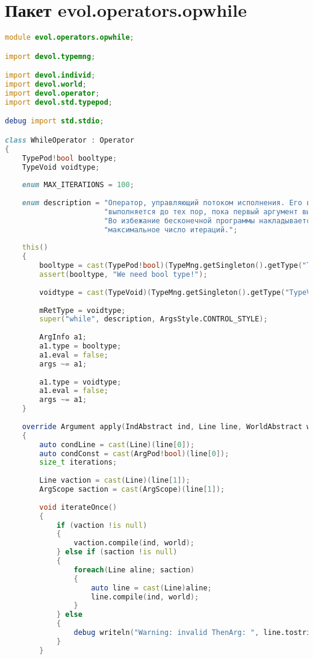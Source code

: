 \documentclass[russian,utf8,emptystyle]{eskdtext}
\begin{document}
\section{Пакет evol.operators.opwhile}
\begin{lstlisting}[language=D]
module evol.operators.opwhile;

import devol.typemng;

import devol.individ;
import devol.world;
import devol.operator;  
import devol.std.typepod;

debug import std.stdio;

class WhileOperator : Operator
{
    TypePod!bool booltype;
    TypeVoid voidtype;
    
    enum MAX_ITERATIONS = 100;
    
    enum description = "Оператор, управляющий потоком исполнения. Его второй аргумент "
                       "выполняется до тех пор, пока первый аргумент вычисляется в ИСТИНА. "
                       "Во избежание бесконечной программы накладывается ограничение на "
                       "максимальное число итераций.";
    
    this()
    {
        booltype = cast(TypePod!bool)(TypeMng.getSingleton().getType("Typebool"));
        assert(booltype, "We need bool type!");
        
        voidtype = cast(TypeVoid)(TypeMng.getSingleton().getType("TypeVoid"));
        
        mRetType = voidtype;
        super("while", description, ArgsStyle.CONTROL_STYLE);
        
        ArgInfo a1;
        a1.type = booltype;
        a1.eval = false;
        args ~= a1;
        
        a1.type = voidtype;
        a1.eval = false;
        args ~= a1;
    }
    
    override Argument apply(IndAbstract ind, Line line, WorldAbstract world)
    {
        auto condLine = cast(Line)(line[0]);
        auto condConst = cast(ArgPod!bool)(line[0]);
        size_t iterations;
        
        Line vaction = cast(Line)(line[1]);
        ArgScope saction = cast(ArgScope)(line[1]);
        
        void iterateOnce()
        {
            if (vaction !is null)
            {
                vaction.compile(ind, world);
            } else if (saction !is null)
            {
                foreach(Line aline; saction)
                {
                    auto line = cast(Line)aline;
                    line.compile(ind, world);
                }
            } else
            {
                debug writeln("Warning: invalid ThenArg: ", line.tostring);
            }
        }
        

\end{lstlisting}
\end{document}

